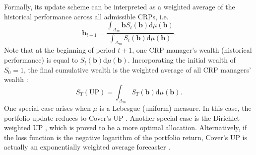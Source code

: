 Formally, its update scheme \citep[Definition~1]{cover96} can be interpreted as a weighted average of the historical performance across all admissible CRPs, i.e.\
\begin{equation}
	\mathbf{b}_{t+1}
	= \frac{\int_{\Delta_m} \mathbf{b} S_{t}(\mathbf{b})\mathrm{d}\mu(\mathbf{b})}{\int_{\Delta_m} S_{t}(\mathbf{b})\mathrm{d}\mu(\mathbf{b})}.
\end{equation}
Note that at the beginning of period $t+1$, one CRP manager's wealth (historical performance) is equal to $S_{t}(\mathbf{b})\mathrm{d}\mu(\mathbf{b})$. Incorporating the initial wealth of $S_0 = 1$, the final cumulative wealth is the weighted average of all CRP managers' wealth \citep[Eq.~(24)]{cover96}:
\begin{equation}
	S_{T}(\mathrm{UP}) = \int_{\Delta_m} S_{T}(\mathbf{b})\mathrm{d}\mu(\mathbf{b}).
\end{equation}
One special case arises when $\mu$ is a Lebesgue (uniform) measure. In this case, the portfolio update reduces to Cover's UP \citep[Eq.~(1.3)]{cover}. Another special case is the Dirichlet-weighted UP \citep{cover96}, which is proved to be a more optimal allocation. Alternatively, if the loss function is the negative logarithm of the portfolio return, Cover's UP is actually an exponentially weighted average forecaster \citep{lugosi}.

